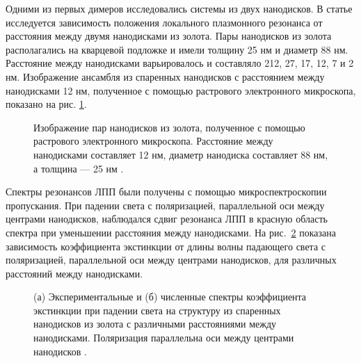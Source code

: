 Одними из первых димеров исследовались системы из двух нанодисков. В статье \cite{plasonrulereq} исследуется зависимость положения локального плазмонного резонанса от расстояния между двумя нанодисками из золота. Пары нанодисков из золота располагались на кварцевой подложке и имели толщину 25 нм и диаметр 88 нм. Расстояние между нанодисками варьировалось и составляло 212, 27, 17, 12, 7 и 2 нм. Изображение ансамбля из спаренных нанодисков с расстоянием между нанодисками 12 нм, полученное с помощью растрового электронного микроскопа, показано на рис. \ref{img:PR_SEM}.
\begin{figure}
\caption{Изображение пар нанодисков из золота, полученное с помощью растрового электронного микроскопа. Расстояние между нанодисками составляет 12 нм, диаметр нанодиска составляет 88 нм, а толщина --- 25 нм \cite{plasonrulereq}.}
\label{img:PR_SEM}
\end{figure}
Спектры резонансов ЛПП были получены с помощью микроспектроскопии пропускания. При падении света с поляризацией, параллельной оси между центрами нанодисков, наблюдался сдвиг резонанса ЛПП в красную область спектра при уменьшении расстояния между нанодисками. На рис.~\ref{img:PR_extinction} показана зависимость коэффициента экстинкции от длины волны падающего света с поляризацией, параллельной оси между центрами нанодисков, для различных расстояний между нанодисками.
\begin{figure}[t]
\caption{(а) Экспериментальные и (б) численные спектры коэффициента экстинкции при падении света на структуру из спаренных нанодисков из золота с различными расстояниями между нанодисками. Поляризация параллельна оси между центрами нанодисков \cite{plasonrulereq}.}
\label{img:PR_extinction}
\end{figure}
